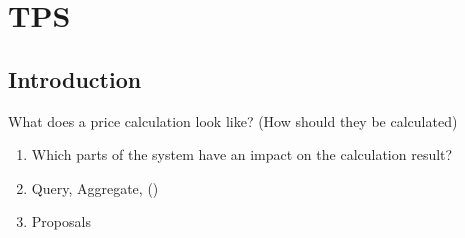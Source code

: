 \graphicspath{{Chapter4/Figs/Vector/}{Chapter4/Figs/}}

%
\chapter{TPS}
\section{Introduction}


What does a price calculation look like? (How should they be calculated)
\begin{enumerate}[label*=\arabic*.]
	\item Which parts of the system have an impact on the calculation result?
	\item Query, Aggregate, ()
	\item Proposals
\end{enumerate}


